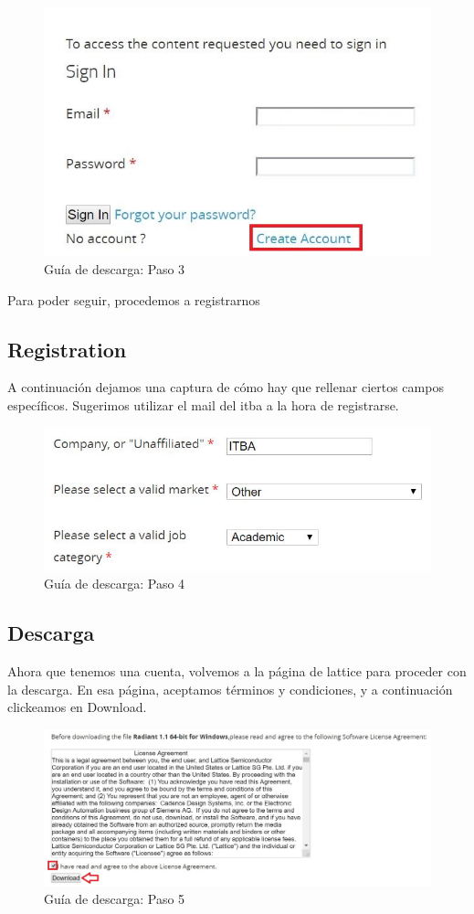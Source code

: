 \documentclass{article}
\begin{document}
\begin{figure}[H]
\centering
\includegraphics[width=0.4\linewidth]{images/3.JPG}
\caption{Guía de descarga: Paso 3}
\label{fig:step3}
\end{figure}

Para poder seguir, procedemos a registrarnos

\subsection{Registration}
A continuación dejamos una captura de cómo hay que rellenar ciertos campos específicos. Sugerimos utilizar el mail del itba a la hora de registrarse.

\begin{figure}[H]
\centering
\includegraphics[width=0.4\linewidth]{images/4.JPG}
\caption{Guía de descarga: Paso 4}
\label{fig:step4}
\end{figure}

\subsection{Descarga}
Ahora que tenemos una cuenta, volvemos a la página de lattice para proceder con la descarga. En esa página, aceptamos términos y condiciones, y a continuación clickeamos en Download.

\begin{figure}[H]
\centering
\includegraphics[width=1\linewidth]{images/5.JPG}
\caption{Guía de descarga: Paso 5}
\label{fig:step5}
\end{figure}
\end{document}
